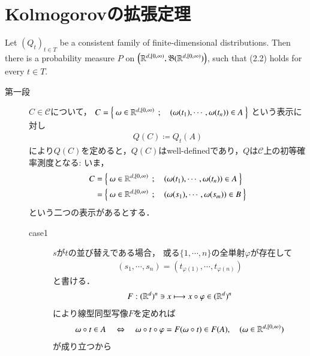 \section{Kolmogorovの拡張定理}
	\begin{screen}
		\begin{thm}
			Let $(Q_t)_{t \in T}$ be a consistent family of finite-dimensional 
			distributions. Then there is a probability measure $P$ on 
			$\left( \mathbb{R}^{d,[0,\infty)}, \mathfrak{B}(\mathbb{R}^{d,[0,\infty)}) \right)$, such that 
			(2.2) holds for every $t \in T$.
		\end{thm}
	\end{screen}
	
	\begin{prf}\mbox{}
		\begin{description}
			\item[第一段]
				$C \in \mathscr{C}$について，
				$C = \left\{\ \omega \in \mathbb{R}^{d,[0,\infty)}\ \, ; \quad (\omega(t_1),\cdots,\omega(t_n)) \in A\ \right\}$
				という表示に対し
				\begin{align}
					Q(C) \coloneqq Q_t(A)
				\end{align}
				により$Q(C)$を定めると，$Q(C)$はwell-definedであり，$Q$は$\mathscr{C}$上の初等確率測度となる:
				いま，
				\begin{align}
					C 
					&= \left\{\ \omega \in \mathbb{R}^{d,[0,\infty)}\ \, ; \quad (\omega(t_1),\cdots,\omega(t_n)) \in A\ \right\} \\
					&= \left\{\ \omega \in \mathbb{R}^{d,[0,\infty)}\ \, ; \quad (\omega(s_1),\cdots,\omega(s_m)) \in B\ \right\} 
				\end{align}
				という二つの表示があるとする．
				\begin{description}
					\item[case1]
						$s$が$t$の並び替えである場合，
						或る$\{1,\cdots,n\}$の全単射$\varphi$が存在して
						\begin{align}
							(s_1,\cdots,s_n) 
							= (t_{\varphi(1)},\cdots,t_{\varphi(n)})
						\end{align}
						と書ける．
						\begin{align}
							F:(\mathbb{R}^d)^n \ni x \longmapsto x \circ \varphi \in (\mathbb{R}^d)^n
						\end{align}
						により線型同型写像$F$を定めれば
						\begin{align}
							\omega \circ t \in A
							\quad \Leftrightarrow \quad \omega \circ t \circ \varphi 
							= F(\omega \circ t) \in F(A),
							\quad (\omega \in \mathbb{R}^{d,[0,\infty)})
						\end{align}
						が成り立つから

\end{description}
\end{description}
\end{prf}
